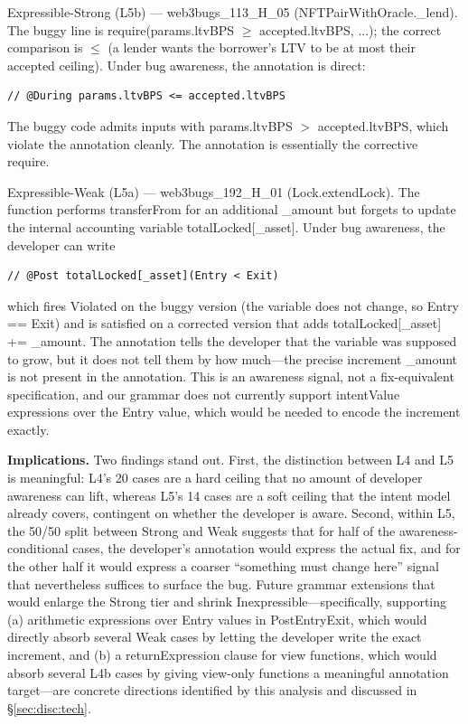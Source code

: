 \documentclass[pdflatex,sn-basic]{sn-jnl}%
\theoremstyle{thmstyleone}%
\theoremstyle{thmstyletwo}%
\theoremstyle{thmstylethree}%
\begin{document}
\noindent Expressible-Strong (L5b) --- web3bugs\_113\_H\_05 (NFTPairWithOracle.\_lend). The buggy line is require(params.ltvBPS $\geq$ accepted.ltvBPS, ...); the correct comparison is $\leq$ (a lender wants the borrower's LTV to be at most their accepted ceiling). Under bug awareness, the annotation is direct:
\begin{verbatim}
// @During params.ltvBPS <= accepted.ltvBPS
\end{verbatim}
The buggy code admits inputs with params.ltvBPS $>$ accepted.ltvBPS, which violate the annotation cleanly. The annotation is essentially the corrective require.

\noindent Expressible-Weak (L5a) --- web3bugs\_192\_H\_01 (Lock.extendLock). The function performs transferFrom for an additional \_amount but forgets to update the internal accounting variable totalLocked[\_asset]. Under bug awareness, the developer can write
\begin{verbatim}
// @Post totalLocked[_asset](Entry < Exit)
\end{verbatim}
which fires Violated on the buggy version (the variable does not change, so Entry == Exit) and is satisfied on a corrected version that adds totalLocked[\_asset] += \_amount. The annotation tells the developer that the variable was supposed to grow, but it does not tell them by how much---the precise increment \_amount is not present in the annotation. This is an awareness signal, not a fix-equivalent specification, and our grammar does not currently support intentValue expressions over the Entry value, which would be needed to encode the increment exactly.

\smallskip
\noindent\textbf{Implications.}
Two findings stand out.
First, the distinction between L4 and L5 is meaningful: L4's 20 cases are a hard ceiling that no amount of developer awareness can lift, whereas L5's 14 cases are a soft ceiling that the intent model already covers, contingent on whether the developer is aware.
Second, within L5, the 50/50 split between Strong and Weak suggests that for half of the awareness-conditional cases, the developer's annotation would express the actual fix, and for the other half it would express a coarser ``something must change here'' signal that nevertheless suffices to surface the bug.
Future grammar extensions that would enlarge the Strong tier and shrink Inexpressible---specifically, supporting (a) arithmetic expressions over Entry values in PostEntryExit, which would directly absorb several Weak cases by letting the developer write the exact increment, and (b) a returnExpression clause for view functions, which would absorb several L4b cases by giving view-only functions a meaningful annotation target---are concrete directions identified by this analysis and discussed in §\ref{sec:disc:tech}.
\end{document}
